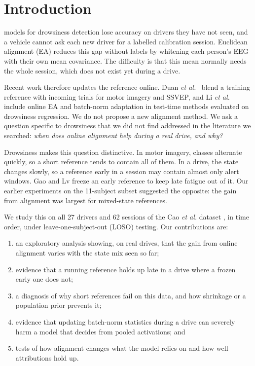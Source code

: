 \section{Introduction}
 models for drowsiness detection lose accuracy on drivers they have not seen, and a vehicle cannot ask each new driver for a labelled calibration session. Euclidean alignment (EA) \cite{he2020transfer} reduces this gap without labels by whitening each person's EEG with their own mean covariance. The difficulty is that this mean normally needs the whole session, which does not exist yet during a drive.

Recent work therefore updates the reference online. Duan \textit{et al.}~\cite{duan2025online} blend a training reference with incoming trials for motor imagery and SSVEP, and Li \textit{et al.}~\cite{li2026backprop} include online EA and batch-norm adaptation in test-time methods evaluated on drowsiness regression. We do not propose a new alignment method. We ask a question specific to drowsiness that we did not find addressed in the literature we searched: \textit{when does online alignment help during a real drive, and why?}

Drowsiness makes this question distinctive. In motor imagery, classes alternate quickly, so a short reference tends to contain all of them. In a drive, the state changes slowly, so a reference early in a session may contain almost only alert windows. Gao and Lv \cite{gao2026early} freeze an early reference to keep late fatigue out of it. Our earlier experiments on the 11-subject subset suggested the opposite: the gain from alignment was largest for mixed-state references.

We study this on all 27 drivers and 62 sessions of the Cao \textit{et al.} dataset \cite{cao2019multichannel}, in time order, under leave-one-subject-out (LOSO) testing. Our contributions are:
\begin{enumerate}
\item an exploratory analysis showing, on real drives, that the gain from online alignment varies with the state mix seen so far;
\item evidence that a running reference holds up late in a drive where a frozen early one does not;
\item a diagnosis of why short references fail on this data, and how shrinkage or a population prior prevents it;
\item evidence that updating batch-norm statistics during a drive can severely harm a model that decides from pooled activations; and
\item tests of how alignment changes what the model relies on and how well attributions hold up.
\end{enumerate}
